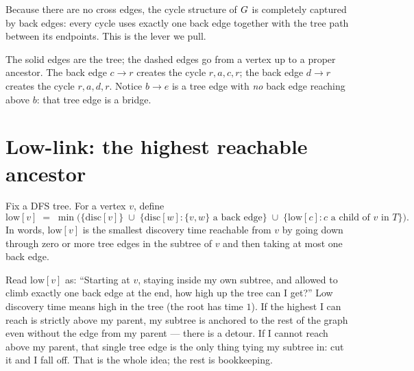 Because there are no cross edges, the cycle structure of $G$ is completely captured
by back edges: every cycle uses exactly one back edge together with the tree path
between its endpoints. This is the lever we pull.

\begin{center}
\end{center}

The solid edges are the tree; the dashed edges go from a vertex up to a proper
ancestor. The back edge $c\!\to\!r$ creates the cycle $r,a,c,r$; the back edge
$d\!\to\!r$ creates the cycle $r,a,d,r$. Notice $b\!\to\!e$ is a tree edge with
\emph{no} back edge reaching above $b$: that tree edge is a bridge.

\section{Low-link: the highest reachable ancestor}
\label{ch10:lowlink}

\begin{definition}
\label{ch10:def-low}
Fix a DFS tree. For a vertex $v$, define
\[
  \mathrm{low}[v] \;=\; \min\Big(
    \{\mathrm{disc}[v]\}
    \;\cup\;
    \{\mathrm{disc}[w] : \{v,w\}\text{ a back edge}\}
    \;\cup\;
    \{\mathrm{low}[c] : c\text{ a child of }v\text{ in }T\}
  \Big).
\]
In words, $\mathrm{low}[v]$ is the smallest discovery time reachable from $v$ by going
down through zero or more tree edges in the subtree of $v$ and then taking at most one
back edge.
\end{definition}

\begin{intuitionbox}
Read $\mathrm{low}[v]$ as: ``Starting at $v$, staying inside my own subtree, and
allowed to climb exactly one back edge at the end, how high up the tree can I get?''
Low discovery time means high in the tree (the root has time $1$). If the highest I
can reach is strictly above my parent, my subtree is anchored to the rest of the graph
even without the edge from my parent --- there is a detour. If I cannot reach above my
parent, that single tree edge is the only thing tying my subtree in: cut it and I fall
off. That is the whole idea; the rest is bookkeeping.
\end{intuitionbox}

